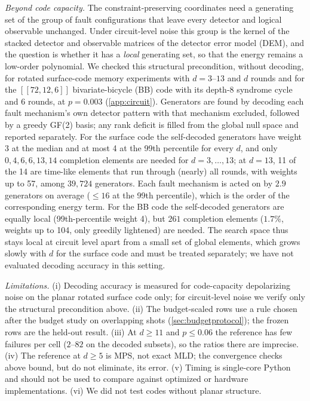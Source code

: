 \documentclass[journal]{IEEEtran}
\begin{document}
\emph{Beyond code capacity.} The constraint-preserving coordinates need a generating set of the group of fault configurations that leave every detector and logical observable unchanged. Under circuit-level noise this group is the kernel of the stacked detector and observable matrices of the detector error model (DEM), and the question is whether it has a \emph{local} generating set, so that the energy remains a low-order polynomial. We checked this structural precondition, without decoding, for rotated surface-code memory experiments with $d=3$--$13$ and $d$ rounds and for the $[[72,12,6]]$ bivariate-bicycle (BB) code with its depth-8 syndrome cycle~\cite{bravyi2024} and 6 rounds, at $p=0.003$ (\cref{app:circuit}). Generators are found by decoding each fault mechanism's own detector pattern with that mechanism excluded, followed by a greedy GF(2) basis; any rank deficit is filled from the global null space and reported separately. For the surface code the self-decoded generators have weight 3 at the median and at most 4 at the 99th percentile for every $d$, and only $0,4,6,6,13,14$ completion elements are needed for $d=3,\dots,13$; at $d=13$, 11 of the 14 are time-like elements that run through (nearly) all rounds, with weights up to 57, among $39{,}724$ generators. Each fault mechanism is acted on by $2.9$ generators on average ($\le 16$ at the 99th percentile), which is the order of the corresponding energy term. For the BB code the self-decoded generators are equally local (99th-percentile weight 4), but $261$ completion elements ($1.7\%$, weights up to 104, only greedily lightened) are needed. The search space thus stays local at circuit level apart from a small set of global elements, which grows slowly with $d$ for the surface code and must be treated separately; we have not evaluated decoding accuracy in this setting.

\emph{Limitations.} (i) Decoding accuracy is measured for code-capacity depolarizing noise on the planar rotated surface code only; for circuit-level noise we verify only the structural precondition above. (ii) The budget-scaled rows use a rule chosen after the budget study on overlapping shots (\cref{sec:budgetprotocol}); the frozen rows are the held-out result. (iii) At $d\ge11$ and $p\le0.06$ the reference has few failures per cell ($2$--$82$ on the decoded subsets), so the ratios there are imprecise. (iv) The reference at $d\ge5$ is MPS, not exact MLD; the convergence checks above bound, but do not eliminate, its error. (v) Timing is single-core Python and should not be used to compare against optimized or hardware implementations. (vi) We did not test codes without planar structure.
\end{document}
